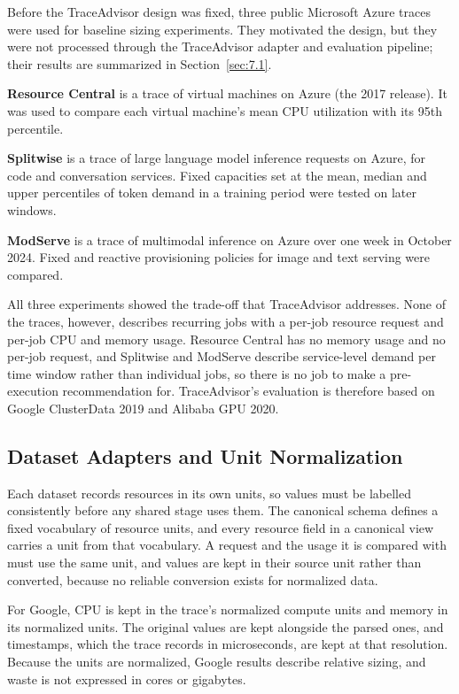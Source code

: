 \documentclass{IEEEtran}
\begin{document}
Before the TraceAdvisor design was fixed, three public Microsoft Azure traces were used for baseline sizing experiments. They motivated the design, but they were not processed through the TraceAdvisor adapter and evaluation pipeline; their results are summarized in Section~\ref{sec:7.1}.

\textbf{Resource Central} is a trace of virtual machines on Azure (the 2017 release). It was used to compare each virtual machine's mean CPU utilization with its 95th percentile.

\textbf{Splitwise} is a trace of large language model inference requests on Azure, for code and conversation services. Fixed capacities set at the mean, median and upper percentiles of token demand in a training period were tested on later windows.

\textbf{ModServe} is a trace of multimodal inference on Azure over one week in October 2024. Fixed and reactive provisioning policies for image and text serving were compared.

All three experiments showed the trade-off that TraceAdvisor addresses. None of the traces, however, describes recurring jobs with a per-job resource request and per-job CPU and memory usage. Resource Central has no memory usage and no per-job request, and Splitwise and ModServe describe service-level demand per time window rather than individual jobs, so there is no job to make a pre-execution recommendation for. TraceAdvisor's evaluation is therefore based on Google ClusterData 2019 and Alibaba GPU 2020.

\subsection{Dataset Adapters and Unit Normalization}\label{sec:3.4}

Each dataset records resources in its own units, so values must be labelled consistently before any shared stage uses them. The canonical schema defines a fixed vocabulary of resource units, and every resource field in a canonical view carries a unit from that vocabulary. A request and the usage it is compared with must use the same unit, and values are kept in their source unit rather than converted, because no reliable conversion exists for normalized data.

For Google, CPU is kept in the trace's normalized compute units and memory in its normalized units. The original values are kept alongside the parsed ones, and timestamps, which the trace records in microseconds, are kept at that resolution. Because the units are normalized, Google results describe relative sizing, and waste is not expressed in cores or gigabytes.
\end{document}
